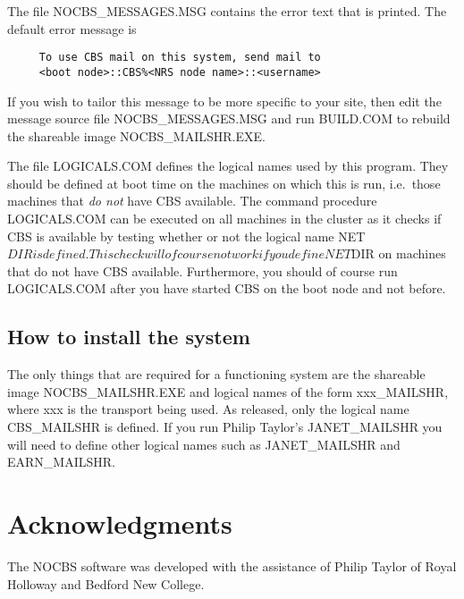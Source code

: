 The file NOCBS\_MESSAGES.MSG contains the error text that is printed.
The default error message is

\begin{verbatim}
     To use CBS mail on this system, send mail to 
     <boot node>::CBS%<NRS node name>::<username>
\end{verbatim}

If you wish to tailor this message to be more specific to your site, then edit
the message source file NOCBS\_MESSAGES.MSG and run BUILD.COM to rebuild the
shareable image NOCBS\_MAILSHR.EXE. 

The file LOGICALS.COM defines the logical names used by this program. They
should be defined at boot time on the machines on which this is run, i.e.\ those
machines that {\em do not} have CBS available. The command procedure
LOGICALS.COM can be executed on all machines in the cluster as it checks if CBS
is available by testing whether or not the logical name NET$DIR is defined. This
check will of course not work if you define NET$DIR on machines that do not have
CBS available. Furthermore, you should of course run LOGICALS.COM after you have
started CBS on the boot node and not before.

\subsection{How to install the system}

The only things that are required for a functioning system are the shareable
image NOCBS\_MAILSHR.EXE and logical names of the form xxx\_MAILSHR, where xxx
is the transport being used. As released, only the logical name CBS\_MAILSHR is
defined. If you run Philip Taylor's JANET\_MAILSHR you will need to define
other logical names such as JANET\_MAILSHR and EARN\_MAILSHR.

\section{Acknowledgments}

The NOCBS software was developed with the assistance of Philip Taylor of Royal
Holloway and Bedford New College.


